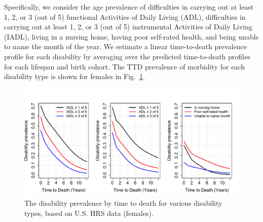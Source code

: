 \documentclass[12pt,oneside,letterpaper,doublespacing]{article}  %
\begin{document}
Specifically, we consider the age prevalence of difficulties in carrying out at
least 1, 2, or 3 (out of 5) functional Activities of Daily Living (ADL),
difficulties in carrying out at least 1, 2, or 3 (out of 5) instrumental
Activities of Daily Living (IADL), living in a nursing home, having poor
self-rated health, and being unable to name the month of the year. We estimate
a linear time-to-death prevalence profile for each disability by averaging over the predicted time-to-death profiles for each lifespan and birth cohort.
 The TTD prevalence of morbidity for
each disability type is shown for females in Fig.~\ref{fig:DisbyTTD}.


\begin{figure}
\begin{adjustwidth}{-1.5cm}{}
	\centering
	\includegraphics[scale=.6]{Figures/fig4.pdf} %
	\caption{The disability prevalence by time to death for various disability types, based on U.S. HRS data (females).}
	\label{fig:DisbyTTD}
\end{adjustwidth}
\end{figure}
\end{document}
